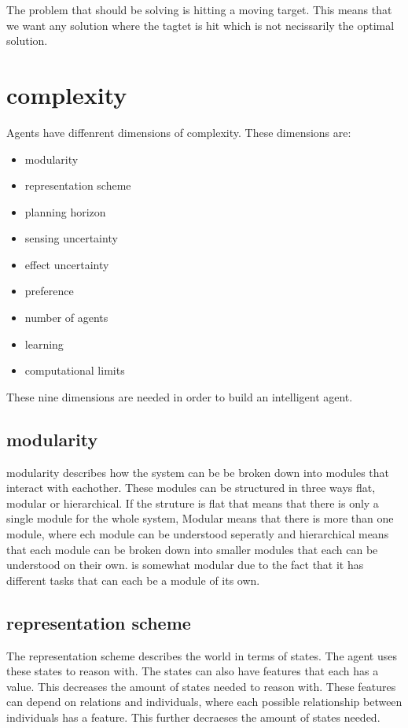 The problem that \name should be solving is hitting a moving target. This means
that we want any solution where the tagtet is hit which is not necissarily the
optimal solution. 



\section{complexity}
Agents have diffenrent dimensions of complexity. These dimensions are:
\begin{itemize}
  \item  modularity
  \item representation scheme
  \item planning horizon 
  \item sensing uncertainty
  \item effect uncertainty
  \item preference
  \item number of agents
  \item learning
  \item computational limits
\end{itemize}

These nine dimensions are needed in order to build an intelligent agent.

\subsection{modularity}
modularity describes how the system can be be broken down into modules that
interact with eachother. These modules can be structured in three ways flat,
modular or hierarchical. If the struture is flat that means that there is only a
single module for the whole system, Modular means that there is more than one
module, where ech module can be understood seperatly and hierarchical means that
each module can be broken down into smaller modules that each can be understood
on their own. \name is somewhat modular due to the fact that it has different
tasks that can each be a module of its own. 

\subsection{representation scheme}
The representation scheme describes the world in terms of states. The agent uses
these states to reason with. The states can also have features that each has a
value. This decreases the amount of states needed to reason with. These features
can depend on relations and individuals, where each possible relationship
between individuals has a feature. This further decraeses the amount of states
needed.







